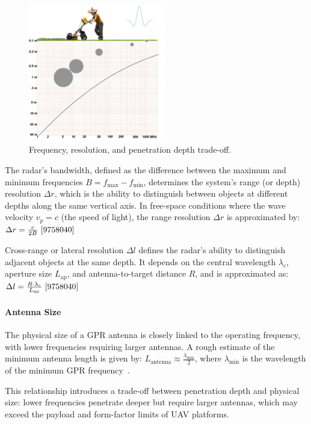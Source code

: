 \begin{figure}[H]
    \centering
    \includegraphics[width=6cm]{figs/Huirui/freq_tradeoff.png}
    \caption{Frequency, resolution, and penetration depth trade-off\protect\footnotemark.}
    \label{fig:freq_tradeoff}
\end{figure}


The radar’s bandwidth, defined as the difference between the maximum and minimum frequencies $B = f_{\text{max}} - f_{\text{min}}$, determines the system’s range (or depth) resolution $\Delta r$, which is the ability to distinguish between objects at different depths along the same vertical axis. In free-space conditions where the wave velocity $v_p = c$ (the speed of light), the range resolution $\Delta r$ is approximated by: \(\Delta r = \frac{c}{2B}~\cite{9758040}\)

Cross-range or lateral resolution $\Delta l$ defines the radar’s ability to distinguish adjacent objects at the same depth. It depends on the central wavelength $\lambda_c$, aperture size $L_{\text{ap}}$, and antenna-to-target distance $R$, and is approximated as: \(\Delta l = \frac{R \cdot \lambda_c}{L_{\text{ap}}}~\cite{9758040}\)



\paragraph{Antenna Size}

The physical size of a \gls{GPR} antenna is closely linked to the operating frequency, with lower frequencies requiring larger antennas. A rough estimate of the minimum antenna length is given by: \(L_{\text{antenna}} \approx \frac{\lambda_{\text{min}}}{2}\), where $\lambda_{\text{min}}$ is the wavelength of the minimum \gls{GPR} frequency~\cite{burr2018design}.

This relationship introduces a trade-off between penetration depth and physical size: lower frequencies penetrate deeper but require larger antennas, which may exceed the payload and form-factor limits of \gls{UAV} platforms.


